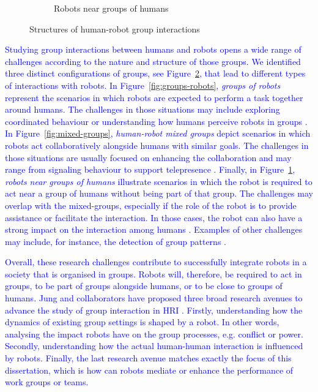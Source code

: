 \begin{figure}[ht]
\begin{subfigure}[b]{0.3\textwidth}
        \caption{Robots near groups of humans}
        \label{fig:groups-humans}
    \end{subfigure}
    \caption{Structures of human-robot group interactions}
    \label{fig:group-interactions}
\end{figure}

\textcolor{blue}{Studying group interactions between humans and robots opens a wide range of challenges according to the nature and structure of those groups. We identified three distinct configurations of groups, see Figure~\ref{fig:group-interactions}, that lead to different types of interactions with robots. In Figure~\ref{fig:groups-robots}, \textit{groups of robots} represent the scenarios in which robots are expected to perform a task together around humans. The challenges in those situations may include exploring coordinated behaviour \cite{admoni2013dancing} or understanding how humans perceive robots in groups \cite{fraune2014negative}. In Figure~\ref{fig:mixed-groups}, \textit{human-robot mixed groups} depict scenarios in which robots act collaboratively alongside humans with similar goals. The challenges in those situations are usually focused on enhancing the collaboration and may range from signaling behaviour \cite{jung2013engaging} to support telepresence \cite{stoll2018wait}. Finally, in Figure~\ref{fig:groups-humans}, \textit{robots near groups of humans} illustrate scenarios in which the robot is required to act near a group of humans without being part of that group. The challenges may overlap with the mixed-groups, especially if the role of the robot is to provide assistance or facilitate the interaction. In those cases, the robot can also have a strong impact on the interaction among humans \cite{jung2018robot}. Examples of other challenges may include, for instance, the detection of group patterns \cite{leite2015comparing}.}



\textcolor{blue}{Overall, these research challenges contribute to successfully integrate robots in a society that is organised in groups. Robots will, therefore, be required to act in groups, to be part of groups alongside humans, or to be close to groups of humans. Jung and collaborators have proposed three broad research avenues to advance the study of group interaction in \gls{HRI} \cite{jung2017robots}. Firstly, understanding how the dynamics of existing group settings is shaped by a robot. In other words, analysing the impact robots have on the group processes, e.g. conflict or power. Secondly, understanding how the actual human-human interaction is influenced by robots. Finally, the last research avenue matches exactly the focus of this dissertation, which is how can robots mediate or enhance the performance of work groups or teams.}



